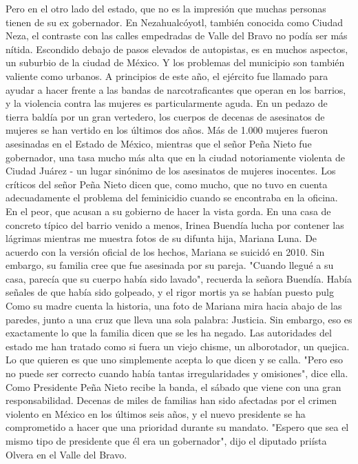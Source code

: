 Pero en el otro lado del estado, que no es la impresión que muchas personas tienen de su ex gobernador.
En Nezahualcóyotl, también conocida como Ciudad Neza, el contraste con las calles empedradas de Valle del Bravo no podía ser más nítida.
Escondido debajo de pasos elevados de autopistas, es en muchos aspectos, un suburbio de la ciudad de México.
Y los problemas del municipio son también valiente como urbanos.
A principios de este año, el ejército fue llamado para ayudar a hacer frente a las bandas de narcotraficantes que operan en los barrios, y la violencia contra las mujeres es particularmente aguda.
En un pedazo de tierra baldía por un gran vertedero, los cuerpos de decenas de asesinatos de mujeres se han vertido en los últimos dos años.
Más de 1.000 mujeres fueron asesinadas en el Estado de México, mientras que el señor Peña Nieto fue gobernador, una tasa mucho más alta que en la ciudad notoriamente violenta de Ciudad Juárez - un lugar sinónimo de los asesinatos de mujeres inocentes.
Los críticos del señor Peña Nieto dicen que, como mucho, que no tuvo en cuenta adecuadamente el problema del feminicidio cuando se encontraba en la oficina.
En el peor, que acusan a su gobierno de hacer la vista gorda.
En una casa de concreto típico del barrio venido a menos, Irinea Buendía lucha por contener las lágrimas mientras me muestra fotos de su difunta hija, Mariana Luna.
De acuerdo con la versión oficial de los hechos, Mariana se suicidó en 2010.
Sin embargo, su familia cree que fue asesinada por su pareja.
"Cuando llegué a su casa, parecía que su cuerpo había sido lavado", recuerda la señora Buendía.
Había señales de que había sido golpeado, y el rigor mortis ya se habían puesto pulg
Como su madre cuenta la historia, una foto de Mariana mira hacia abajo de las paredes, junto a una cruz que lleva una sola palabra: Justicia.
Sin embargo, eso es exactamente lo que la familia dicen que se les ha negado.
Las autoridades del estado me han tratado como si fuera un viejo chisme, un alborotador, un quejica.
Lo que quieren es que uno simplemente acepta lo que dicen y se calla.
"Pero eso no puede ser correcto cuando había tantas irregularidades y omisiones", dice ella.
Como Presidente Peña Nieto recibe la banda, el sábado que viene con una gran responsabilidad.
Decenas de miles de familias han sido afectadas por el crimen violento en México en los últimos seis años, y el nuevo presidente se ha comprometido a hacer que una prioridad durante su mandato.
"Espero que sea el mismo tipo de presidente que él era un gobernador", dijo el diputado priísta Olvera en el Valle del Bravo.
